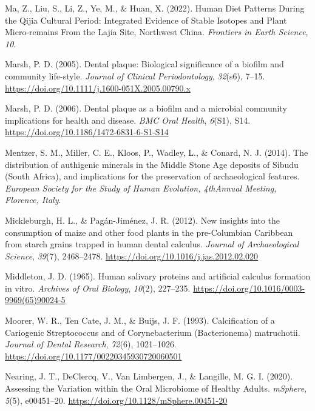 \documentclass[
  b5paper,
]{book}
\newlength{\cslhangindent}
\newenvironment{CSLReferences}[2] %
 {\begin{list}{}{%
  \setlength{\itemindent}{0pt}
  \setlength{\leftmargin}{0pt}
  \setlength{\parsep}{0pt}
  \ifodd #1
   \setlength{\leftmargin}{\cslhangindent}
   \setlength{\itemindent}{-1\cslhangindent}
  \fi
  \setlength{\itemsep}{#2\baselineskip}}}
 {\end{list}}
\begin{document}
\begin{CSLReferences}{1}{0}
Ma, Z., Liu, S., Li, Z., Ye, M., \& Huan, X. (2022). Human {Diet
Patterns During} the {Qijia Cultural Period}: {Integrated Evidence} of
{Stable Isotopes} and {Plant Micro-remains From} the {Lajia Site},
{Northwest China}. \emph{Frontiers in Earth Science}, \emph{10}.

Marsh, P. D. (2005). Dental plaque: Biological significance of a biofilm
and community life-style. \emph{Journal of Clinical Periodontology},
\emph{32}(s6), 7--15.
\url{https://doi.org/10.1111/j.1600-051X.2005.00790.x}

Marsh, P. D. (2006). Dental plaque as a biofilm and a microbial
community \textendash{} implications for health and disease. \emph{BMC
Oral Health}, \emph{6}(S1), S14.
\url{https://doi.org/10.1186/1472-6831-6-S1-S14}

Mentzer, S. M., Miller, C. E., Kloos, P., Wadley, L., \& Conard, N. J.
(2014). The distribution of authigenic minerals in the {Middle Stone
Age} deposits of {Sibudu} ({South Africa}), and implications for the
preservation of archaeological features. \emph{European Society for the
Study of Human Evolution, {4thAnnual} Meeting, Florence, Italy}.

Mickleburgh, H. L., \& Pagán-Jiménez, J. R. (2012). New insights into
the consumption of maize and other food plants in the pre-{Columbian
Caribbean} from starch grains trapped in human dental calculus.
\emph{Journal of Archaeological Science}, \emph{39}(7), 2468--2478.
\url{https://doi.org/10.1016/j.jas.2012.02.020}

Middleton, J. D. (1965). Human salivary proteins and artificial calculus
formation in vitro. \emph{Archives of Oral Biology}, \emph{10}(2),
227--235. \url{https://doi.org/10.1016/0003-9969(65)90024-5}

Moorer, W. R., Ten Cate, J. M., \& Buijs, J. F. (1993). Calcification of
a {Cariogenic Streptococcus} and of {Corynebacterium} ({Bacterionema})
matruchotii. \emph{Journal of Dental Research}, \emph{72}(6),
1021--1026. \url{https://doi.org/10.1177/00220345930720060501}

Nearing, J. T., DeClercq, V., Van Limbergen, J., \& Langille, M. G. I.
(2020). Assessing the {Variation} within the {Oral Microbiome} of
{Healthy Adults}. \emph{mSphere}, \emph{5}(5), e00451--20.
\url{https://doi.org/10.1128/mSphere.00451-20}


\end{CSLReferences}
\end{document}
